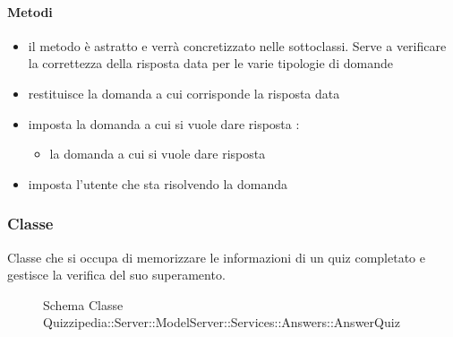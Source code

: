 \paragraph{Metodi}
\begin{itemize}
\item {}
\newline
il metodo è astratto e verrà concretizzato nelle sottoclassi. Serve a verificare la correttezza della risposta data per le varie tipologie di domande
\newline
\item {}
\newline
restituisce la domanda a cui corrisponde la risposta data
\newline
\item {}
\newline
imposta la domanda a cui si vuole dare risposta
\newline
{} :
\begin{itemize}
\item {}
\newline
la domanda a cui si vuole dare risposta
\end{itemize}
\item {}
\newline
imposta l'utente che sta risolvendo la domanda
\newline
\end{itemize}
\subsubsection{Classe }
Classe che si occupa di memorizzare le informazioni di un quiz completato e gestisce la verifica del suo superamento.
\begin{figure}[H]
\centering
\noindent{}
\caption[Schema Classe AnswerQuiz]{Schema Classe Quizzipedia::Server::ModelServer::Services::Answers::AnswerQuiz}
\end{figure}

